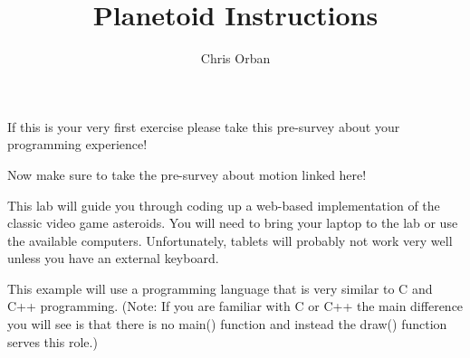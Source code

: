\documentclass{ximera}
\author{Chris Orban}
\title{Planetoid Instructions}
\begin{document}
\begin{abstract}
\end{abstract}
\maketitle

If this is your very first exercise please take this pre-survey about
your programming experience!

Now make sure to take the pre-survey about motion linked here!

This lab will guide you through coding up a web-based implementation
of the classic video game asteroids. You will need to bring your
laptop to the lab or use the available computers. Unfortunately,
tablets will probably not work very well unless you have an external
keyboard.

This example will use a programming language that is very similar to C
and C++ programming. (Note: If you are familiar with C or C++ the main
difference you will see is that there is no main() function and
instead the draw() function serves this role.)
\end{document}
